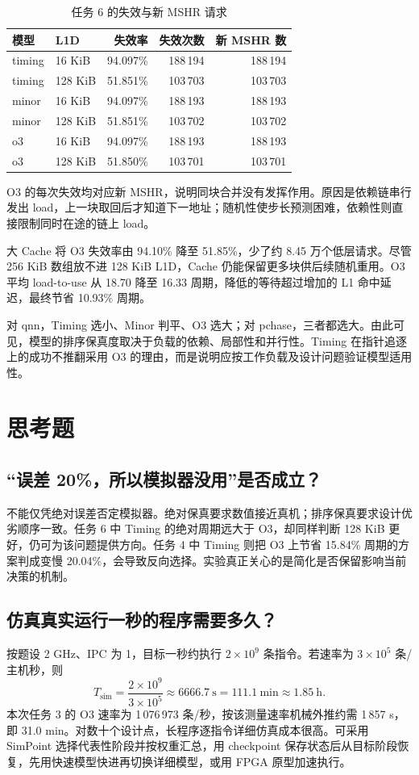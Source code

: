 \documentclass[12pt,a4paper,fontset=mac]{ctexart}
\begin{document}
\begin{table}[H]\centering\small
\caption{任务 6 的失效与新 MSHR 请求}\label{tab:pchasemem}
\begin{tabular}{llrrr}\toprule
模型 & L1D & 失效率 & 失效次数 & 新 MSHR 数 \\\midrule
timing & 16 KiB & 94.097\% & 188\,194 & 188\,194 \\
timing & 128 KiB & 51.851\% & 103\,703 & 103\,703 \\
minor & 16 KiB & 94.097\% & 188\,193 & 188\,193 \\
minor & 128 KiB & 51.851\% & 103\,702 & 103\,702 \\
o3 & 16 KiB & 94.097\% & 188\,193 & 188\,193 \\
o3 & 128 KiB & 51.850\% & 103\,701 & 103\,701 \\
\bottomrule\end{tabular}\end{table}
O3 的每次失效均对应新 MSHR，说明同块合并没有发挥作用。原因是依赖链串行发出 load，上一块取回后才知道下一地址；随机性使步长预测困难，依赖性则直接限制同时在途的链上 load。

大 Cache 将 O3 失效率由 94.10\% 降至 51.85\%，少了约 8.45 万个低层请求。尽管 256 KiB 数组放不进 128 KiB L1D，Cache 仍能保留更多块供后续随机重用。O3 平均 load-to-use 从 18.70 降至 16.33 周期，降低的等待超过增加的 L1 命中延迟，最终节省 10.93\% 周期。

对 qnn，Timing 选小、Minor 判平、O3 选大；对 pchase，三者都选大。由此可见，模型的排序保真度取决于负载的依赖、局部性和并行性。Timing 在指针追逐上的成功不推翻采用 O3 的理由，而是说明应按工作负载及设计问题验证模型适用性。

\section{思考题}
\subsection{“误差 20\%，所以模拟器没用”是否成立？}
不能仅凭绝对误差否定模拟器。绝对保真要求数值接近真机；排序保真要求设计优劣顺序一致。任务 6 中 Timing 的绝对周期远大于 O3，却同样判断 128 KiB 更好，仍可为该问题提供方向。任务 4 中 Timing 则把 O3 上节省 15.84\% 周期的方案判成变慢 20.04\%，会导致反向选择。实验真正关心的是简化是否保留影响当前决策的机制。

\subsection{仿真真实运行一秒的程序需要多久？}
按题设 2 GHz、IPC 为 1，目标一秒约执行 $2\times10^9$ 条指令。若速率为 $3\times10^5$ 条/主机秒，则
\[
T_{\mathrm{sim}}=\frac{2\times10^9}{3\times10^5}
\approx6666.7\ \mathrm{s}=111.1\ \mathrm{min}\approx1.85\ \mathrm{h}.
\]
本次任务 3 的 O3 速率为 1\,076\,973 条/秒，按该测量速率机械外推约需 1\,857 s，即 31.0 min。对数十个设计点，长程序逐指令详细仿真成本很高。可采用 SimPoint 选择代表性阶段并按权重汇总，用 checkpoint 保存状态后从目标阶段恢复，先用快速模型快进再切换详细模型，或用 FPGA 原型加速执行。
\end{document}
